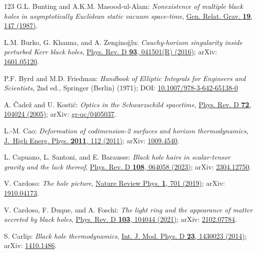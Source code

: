 \begin{thebibliography}{123}
G.L. Bunting and A.K.M. Masood-ul-Alam:
{\em Nonexistence of multiple black holes in asymptotically Euclidean static vacuum space-time},
\href{https://doi.org/10.1007/BF00770326}{Gen. Relat. Grav. {\bf 19}, 147 (1987)}.

L.M. Burko, G. Khanna, and A. Zenginoğlu: {\em
Cauchy-horizon singularity inside perturbed Kerr black holes},
\href{https://doi.org/10.1103/PhysRevD.93.041501}{Phys. Rev. D {\bf 93}, 041501(R) (2016)};
arXiv: \href{https://arxiv.org/abs/1601.05120}{1601.05120}.

P.F. Byrd and M.D. Friedman:
{\em Handbook of Elliptic Integrals for Engineers and Scientists},
2nd ed., Springer (Berlin) (1971);
DOI: \href{https://doi.org/10.1007/978-3-642-65138-0}{10.1007/978-3-642-65138-0}

A. \v{C}ade\v{z} and U. Kosti\'c:
{\em Optics in the Schwarzschild spacetime},
\href{https://doi.org/10.1103/PhysRevD.72.104024}{Phys. Rev. D {\bf 72}, 104024 (2005)};
arXiv: \href{https://arxiv.org/abs/gr-qc/0405037}{gr-qc/0405037}.

L.-M. Cao:
{\em Deformation of codimension-2 surfaces and horizon thermodynamics},
\href{https://doi.org/10.1007/JHEP03(2011)112}{J.~High Energ. Phys. {\bf 2011}, 112 (2011)};
arXiv: \href{https://arxiv.org/abs/1009.4540}{1009.4540}.

L. Capuano, L. Santoni, and E. Barausse:
{\em Black hole hairs in scalar-tensor gravity and the lack thereof},
\href{https://doi.org/10.1103/PhysRevD.108.064058}{Phys. Rev. D {\bf 108}, 064058 (2023)};
arXiv: \href{https://arxiv.org/abs/2304.12750}{2304.12750}.

V. Cardoso:
{\em The hole picture},
\href{https://doi.org/10.1038/s42254-019-0119-2}{Nature Review Phys. {\bf 1}, 701 (2019)};
arXiv: \href{https://arxiv.org/abs/1910.04173}{1910.04173}.

V. Cardoso, F. Duque, and A. Foschi:
{\em The light ring and the appearance of matter accreted by black holes},
\href{https://doi.org/10.1103/PhysRevD.103.104044}{Phys. Rev. D {\bf 103}, 104044 (2021)};
arXiv: \href{https://arxiv.org/abs/2102.07784}{2102.07784}.

S. Carlip:
{\em Black hole thermodynamics},
\href{https://doi.org/10.1142/S0218271814300237}{Int. J. Mod. Phys. D {\bf 23}, 1430023 (2014)};
arXiv: \href{https://arxiv.org/abs/1410.1486}{1410.1486}.


\end{thebibliography}

